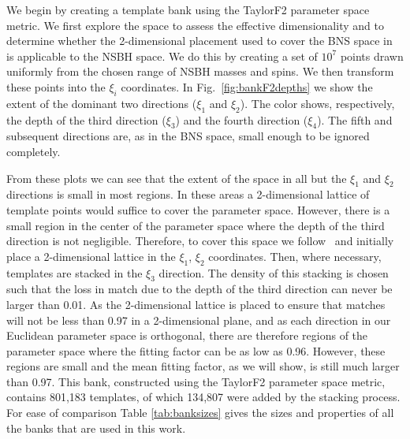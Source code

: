 We begin by creating a template bank using the TaylorF2 parameter space metric.
We first explore the space to assess the effective dimensionality and to
determine whether the 2-dimensional placement used to cover the \ac{BNS}
space in~\cite{Brown:2012qf} is applicable to the \ac{NSBH}
space. We do this by creating a set of $10^7$ points drawn uniformly from the
chosen range of \ac{NSBH} masses and spins. We then transform these points
into the $\xi_i$ coordinates. In Fig.~\ref{fig:bankF2depths} we show the
extent of the dominant two directions ($\xi_1$ and $\xi_2$). The color shows,
respectively, the depth of the third direction ($\xi_3$) and the fourth
direction ($\xi_4$). The fifth and subsequent directions are, as in the \ac{BNS}
space, small enough to be ignored completely.

From these plots we can see that the extent of the space in all but the $\xi_1$
and $\xi_2$ directions is small in most regions. In these areas a
2-dimensional lattice of template points would suffice to cover the parameter
space. However, there is a
small region in the center of the parameter space where the depth of the third
direction is not negligible. Therefore, to cover this space we
follow~\cite{Brown:2012qf} and initially place a 2-dimensional lattice in the
$\xi_1$, $\xi_2$ coordinates. Then, where necessary, templates are stacked in
the $\xi_3$ direction. The density of this stacking is chosen such that the loss
in match due to the depth of the third direction can never be larger than 0.01.
As the 2-dimensional lattice is placed to ensure that matches will not be less
than 0.97 in a 2-dimensional plane, and as each direction in our Euclidean 
parameter space is orthogonal, there are therefore regions of the parameter
space where the fitting factor can be as low as 0.96. However, these regions are
small and the mean fitting factor, as we will show, is still much larger than
0.97. This bank, constructed using the TaylorF2 parameter space metric, contains
801,183 templates, of which 134,807 were added by the stacking process. For
ease of comparison Table \ref{tab:banksizes} gives the sizes and properties of
all the banks that are used in this work.

